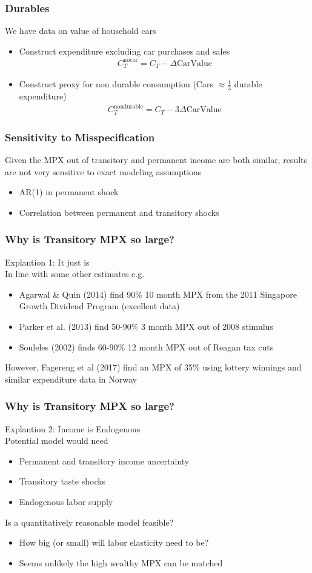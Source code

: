 \documentclass{beamer}
\begin{document}
\frame
{
	\frametitle{Durables}
	We have data on value of household cars\\
	\begin{itemize}
		\item Construct expenditure excluding car purchases and sales
		\begin{align*}
		C_T^{\text{nocar}} = C_T - \Delta \text{CarValue}
		\end{align*}
		\item Construct proxy for non durable consumption (Cars $\approx \frac{1}{3}$ durable expenditure)
		\begin{align*}
		C_T^{\text{nondurable}} = C_T - 3\Delta \text{CarValue}
		\end{align*}
	\end{itemize}
}
\frame
{
	\frametitle{Sensitivity to Misspecification}
	Given the MPX out of transitory and permanent income are both similar, results are not very sensitive to exact modeling assumptions
	\begin{itemize}
		\item AR(1) in permanent shock
		\item Correlation between permanent and transitory shocks
	\end{itemize}
}
\frame
{
	\frametitle{Why is Transitory MPX so large?}
	Explantion 1: It just is \\
	\bigskip
	In line with some other estimates e.g.
	\begin{itemize}
		\item Agarwal \& Quin (2014) find 90\% 10 month MPX from the 2011 Singapore Growth Dividend Program (excellent data)
		\item Parker et al. (2013) find 50-90\% 3 month MPX out of 2008 stimulus
		\item Souleles (2002) finds 60-90\% 12 month MPX out of Reagan tax cuts
	\end{itemize}
	\pause
	However, Fagereng et al (2017) find an MPX of 35\% using lottery winnings and similar expenditure data in Norway

}
\frame
{
	\frametitle{Why is Transitory MPX so large?}
	Explantion 2: Income is Endogenous\\
	\bigskip
	Potential model would need
	\begin{itemize}
		\item Permanent and transitory income uncertainty
		\item Transitory taste shocks
		\item Endogenous labor supply
	\end{itemize}
	Is a quantitatively reasonable model feasible?
	\begin{itemize}
	\item How big (or small) will labor elasticity need to be?
	\item Seems unlikely the high wealthy MPX can be matched
\end{itemize}
}
\end{document}
